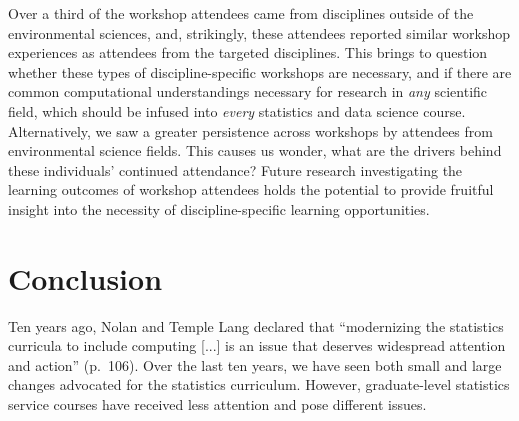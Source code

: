\documentclass[12pt]{article}
\begin{document}
\quad Over a third of the workshop attendees came from disciplines outside of 
the environmental sciences, and, strikingly, these attendees reported similar
workshop experiences as attendees from the targeted disciplines. This brings
to question whether these types of discipline-specific workshops are necessary, and
if there are common computational understandings necessary for
research in \emph{any} scientific field, which should be infused into 
\emph{every} statistics and data science course. Alternatively, we saw a greater
persistence across workshops by attendees from environmental science fields. 
This causes us wonder, what are the drivers behind these individuals' continued
attendance? Future research investigating the learning outcomes of workshop
attendees holds the potential to provide fruitful insight into the necessity of
discipline-specific learning opportunities. 


\section{Conclusion}
\label{sec:conclusion}

\noindent Ten years ago, Nolan and Temple Lang declared that ``modernizing the
statistics curricula to include computing [...] is an issue that deserves
widespread attention and action'' (p.\ 106). Over the last ten years, we have
seen both small and large changes advocated for the statistics curriculum. 
However, graduate-level statistics service courses have received less
attention and pose different issues. 
\end{document}
